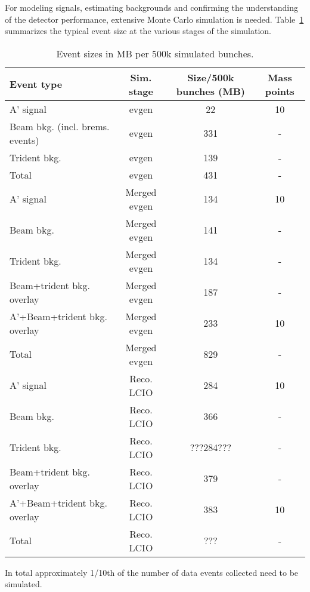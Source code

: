 For modeling signals, estimating backgrounds and confirming the understanding of the detector 
performance, extensive Monte Carlo simulation is needed. Table~\ref{tab:mc_event_size} summarizes 
the typical event size at the various stages of the simulation. 
\begin{table}[]
\centering
\begin{tabular}{|lccc|}
\hline
Event type & Sim. stage & Size/500k bunches (MB) & Mass points  \\
\hline 
A' signal & evgen & 22 & 10  \\
Beam bkg. (incl. brems. events) & evgen & 331 & -\\ 
Trident bkg. & evgen & 139 & - \\
\hline
Total & evgen & 431 & -\\
\hline
A' signal & Merged evgen & 134 & 10 \\
Beam bkg. & Merged evgen & 141 & - \\ 
Trident bkg. & Merged evgen & 134 & - \\
Beam+trident bkg. overlay & Merged evgen & 187 & - \\ 
A'+Beam+trident bkg. overlay & Merged evgen & 233 & 10 \\ 
\hline
Total & Merged evgen & 829 & - \\
\hline
A' signal & Reco. LCIO  & 284 & 10 \\
Beam bkg. & Reco. LCIO  & 366 & - \\ 
Trident bkg. & Reco. LCIO  & ???284??? & - \\
Beam+trident bkg. overlay & Reco. LCIO  & 379 & - \\ 
A'+Beam+trident bkg. overlay & Reco. LCIO  & 383 & 10 \\ 
\hline
Total & Reco. LCIO  & ??? & - \\
\hline
\end{tabular}
\caption{{\small Event sizes in MB per 500k simulated bunches. }}
\label{tab:mc_event_size}
\end{table}
%
%
In total approximately 1/10th of the number of data events collected need to be simulated. 

